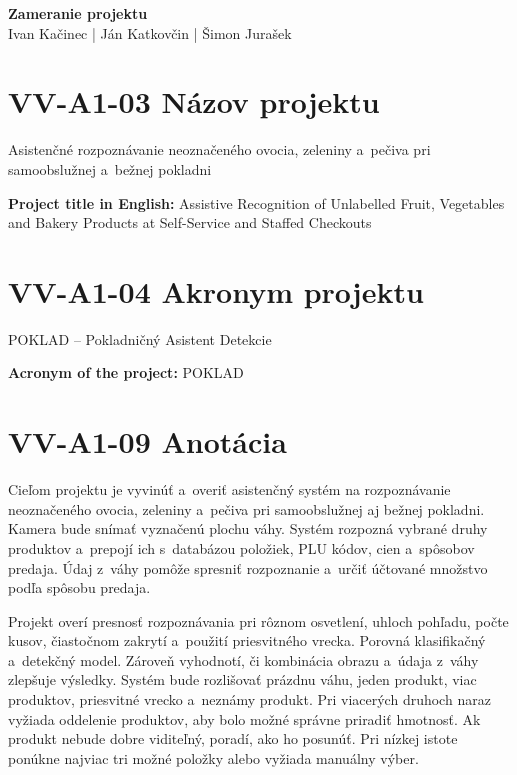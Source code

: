 \documentclass[10pt,twocolumn,twoside,slovak,a4paper]{article}
\begin{document}
\begin{center}
  {\LARGE\bfseries Zameranie projektu}\\[0.6em]
  {\large Ivan Kačinec | Ján Katkovčin | Šimon Jurašek}\\[0.3em]
\end{center}


\section*{VV-A1-03 Názov projektu}

Asistenčné rozpoznávanie neoznačeného ovocia, zeleniny a~pečiva
pri samoobslužnej a~bežnej pokladni

\textbf{Project title in English:}
Assistive Recognition of Unlabelled Fruit, Vegetables and Bakery
Products at Self-Service and Staffed Checkouts

\section*{VV-A1-04 Akronym projektu}

POKLAD -- Pokladničný Asistent Detekcie

\textbf{Acronym of the project:} POKLAD

\section*{VV-A1-09 Anotácia}

Cieľom projektu je vyvinúť a~overiť asistenčný systém na rozpoznávanie neoznačeného ovocia, zeleniny a~pečiva pri samoobslužnej aj bežnej pokladni. Kamera bude snímať vyznačenú plochu váhy. Systém rozpozná vybrané druhy produktov a~prepojí ich s~databázou položiek, PLU kódov, cien a~spôsobov predaja. Údaj z~váhy pomôže spresniť rozpoznanie a~určiť účtované množstvo podľa spôsobu predaja.

Projekt overí presnosť rozpoznávania pri rôznom osvetlení, uhloch pohľadu, počte kusov, čiastočnom zakrytí a~použití priesvitného vrecka. Porovná klasifikačný a~detekčný model. Zároveň vyhodnotí, či kombinácia obrazu a~údaja z~váhy zlepšuje výsledky. Systém bude rozlišovať prázdnu váhu, jeden produkt, viac produktov, priesvitné vrecko a~neznámy produkt. Pri viacerých druhoch naraz vyžiada oddelenie produktov, aby bolo možné správne priradiť hmotnosť. Ak produkt nebude dobre viditeľný, poradí, ako ho posunúť. Pri nízkej istote ponúkne najviac tri možné položky alebo vyžiada manuálny výber.
\end{document}
